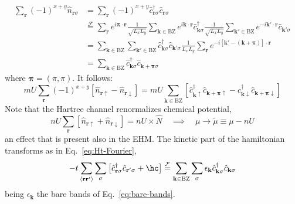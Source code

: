 \begin{align}
	\sum_\mathbf{r} (-1)^{x+y} \hat n_{\mathbf{r}\sigma} &= \sum_\mathbf{r} (-1)^{x+y} \hat c_{\mathbf{r}\sigma}^\dagger \hat c_{\mathbf{r}\sigma} \nonumber \\
	&\stackrel{\mathcal{F}}{=} \sum_\mathbf{r} e^{i \bm{\pi} \cdot \mathbf{r}}
	\frac{1}{\sqrt{L_x L_y}} \sum_{\mathbf{k} \in \mathrm{BZ}} e^{i \mathbf{k} \cdot \mathbf{r}} \hat c_{\mathbf{k}\sigma}^\dagger \frac{1}{\sqrt{L_x L_y}} \sum_{\mathbf{k}' \in \mathrm{BZ}} e^{-i \mathbf{k}' \cdot \mathbf{r}} \hat c_{\mathbf{k}'\sigma} \nonumber \\
	&=\sum_{\mathbf{k} \in \mathrm{BZ}} \sum_{\mathbf{k}' \in \mathrm{BZ}} \hat c_{\mathbf{k}\sigma}^\dagger \hat c_{\mathbf{k}'\sigma} \frac{1}{L_x L_y} \sum_\mathbf{r} e^{-i [\mathbf{k}' - (\mathbf{k} + \bm{\pi}) ] \cdot \mathbf{r}} \nonumber \\
	&= \sum_{\mathbf{k} \in \mathrm{BZ}} \hat c_{\mathbf{k}\sigma}^\dagger \hat c_{\mathbf{k}+\bm{\pi}\sigma}\label{appeq:af-hm-staggered-n-transform}
\end{align}
where $\bm{\pi} = (\pi,\pi)$. It follows:
\[
mU \sum_\mathbf{r} (-1)^{x+y} \left[
		\hat n_{\mathbf{r}\uparrow} - \hat n_{\mathbf{r}\downarrow}
	\right] = mU \sum_{\mathbf{k} \in \mathrm{BZ}} \left[
		\hat c_{\mathbf{k}\uparrow}^\dagger \hat c_{\mathbf{k}+\bm{\pi}\uparrow} - \hat c_{\mathbf{k}\downarrow}^\dagger \hat c_{\mathbf{k}+\bm{\pi}\downarrow}
	\right]
\]
Note that the Hartree channel renormalizes chemical potential,
\[
	nU \sum_\mathbf{r} \left[
	\hat n_{\mathbf{r}\uparrow} + \hat n_{\mathbf{r}\downarrow}
	\right] = nU \times \hat N
	\quad\implies\quad
	\mu \to \tilde{\mu} \equiv \mu - nU
\]
an effect that is present also in the EHM. The kinetic part of the hamiltonian transforms as in Eq.~\eqref{eq:Ht-Fourier},
\[
	-t \sum_{\langle \mathbf{r}\mathbf{r}' \rangle} \sum_\sigma \left[
	\hat c_{\mathbf{r}\sigma}^\dagger \hat c_{\mathbf{r}'\sigma} + \hc
	\right] \stackrel{\mathcal{F}}{=} \sum_{\mathbf{k} \in \mathrm{BZ}} \sum_\sigma \epsilon_\mathbf{k} \hat c_{\mathbf{k}\sigma}^\dagger \hat c_{\mathbf{k}\sigma}
\]
being $\epsilon_\mathbf{k}$ the bare bands of Eq.~\eqref{eq:bare-bands}.

